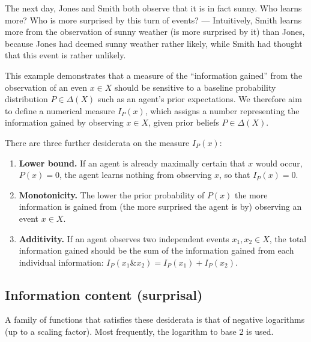 \documentclass[nobib,nofonts]{tufte-handout}
\begin{document}
The next day, Jones and Smith both observe that it is in fact sunny.
Who learns more? Who is more surprised by this turn of events? ---
Intuitively, Smith learns more from the observation of sunny weather (is more surprised by it) than Jones, because Jones had deemed sunny weather rather likely, while Smith had thought that this event is rather unlikely.

This example demonstrates that a measure of the ``information gained'' from the observation of an even $x \in X$ should be sensitive to a baseline probability distribution $P \in \Delta(X)$ such as an agent's prior expectations.
We therefore aim to define a numerical measure $I_{P}(x)$, which assigns a number representing the information gained by observing $x \in X$, given prior beliefs $P \in \Delta(X)$.

There are three further desiderata on the measure $I_{P}(x)$:
\begin{enumerate}
  \item \textbf{Lower bound.} If an agent is already maximally certain that $x$ would occur, $P(x) = 0$, the agent learns nothing from observing $x$, so that $I_{P}(x)=0$.
  \item \textbf{Monotonicity.} The lower the prior probability of $P(x)$ the more information is gained from (the more surprised the agent is by) observing an event $x \in X$.
  \item \textbf{Additivity.} If an agent observes two independent events $x_{1}, x_{2} \in X$, the total information gained should be the sum of the information gained from each individual information: $I_{P}(x_{1} \& x_{2}) = I_{P}(x_{1}) + I_{P}(x_{2})$.
\end{enumerate}

\subsection{Information content (surprisal)}

A family of functions that satisfies these desiderata is that of negative logarithms (up to a scaling factor).
Most frequently, the logarithm to base 2 is used.
\end{document}
